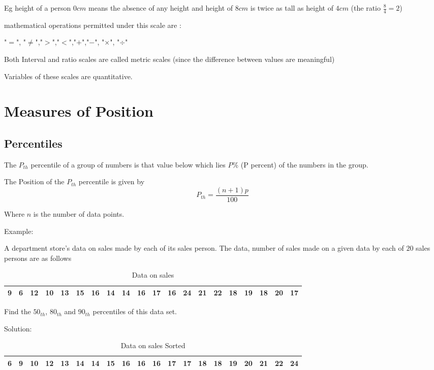 \documentclass[12pt]{article}
\begin{document}
Eg height of a person $0cm$ means the absence of any height and height of $8cm$ is twice as tall as height of $4cm$ (the ratio $\frac{8}{4} = 2$)

mathematical operations permitted under this scale are :

"$=$", "$\neq$","$>$","$<$","$+$","$-$", "$\times$", "$\div$"

Both Interval and ratio scales are called metric scales (since the difference between values are meaningful)

Variables of these scales are quantitative.
\newpage

\section{Measures of Position}%

\subsection{Percentiles}
The $P_{th}$ percentile of a group of numbers is that value below which lies $P\%$ (P percent) of the numbers in the group.

The Position of the $P_{th}$ percentile is given by
\begin{equation}
    P_{th} = \frac{(n+1)p}{100}
\end{equation}

Where $n$ is the number of data points.

Example:

A department store's data on sales made by each  of its sales person. The data, number of sales made on a given data by each of $20$ sales persons are as follows
\begin{table}[H]
    \centering
    \caption{Data on sales}
    \begin{tabular}{|*{20}{c|}}

        \hline
        9  & 6  & 12 & 10 & 13 & 15 & 16 & 14 & 14 & 16 &
        17 & 16 & 24 & 21 & 22 & 18 & 19 & 18 & 20 & 17   \\
        \hline
    \end{tabular}
\end{table}


Find the $50_{th}$, $80_{th}$ and $90_{th}$ percentiles of this data set.

Solution:
\begin{table}[H]
    \centering
    \caption{Data on sales Sorted}
    \begin{tabular}{|*{20}{c|}}

        \hline
        6 & 9 & 10 & 12 & 13 & 14 & 14 & 15 & 16 & 16 & 16 & 17 & 17 & 18 & 18 & 19 & 20 & 21 & 22 & 24 \\
        \hline
    \end{tabular}
\end{table}
\end{document}
